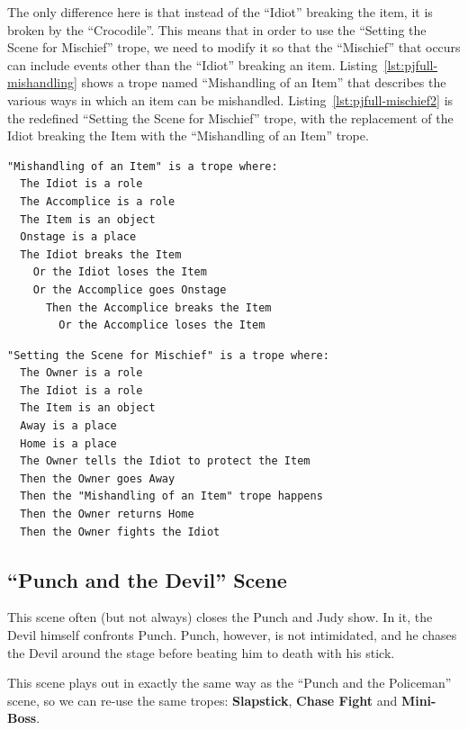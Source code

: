 \documentclass[11pt]{report}
\begin{document}
The only difference here is that instead of the ``Idiot'' breaking the item, it
is broken by the ``Crocodile''. This means that in order to use the ``Setting
the Scene for Mischief'' trope, we need to modify it so that the ``Mischief''
that occurs can include events other than the ``Idiot'' breaking an item.
Listing~\ref{lst:pjfull-mishandling} shows a trope named ``Mishandling of an Item'' that describes the various
ways in which an item can be mishandled. Listing~\ref{lst:pjfull-mischief2} is
the redefined ``Setting the Scene for Mischief'' trope, with the replacement of
the Idiot breaking the Item with the ``Mishandling of an Item'' trope.

\begin{lstlisting}[showstringspaces=false,
label=lst:pjfull-mishandling,caption={The ``Mishandling of an Item'' trope in TropICAL}]
"Mishandling of an Item" is a trope where:
  The Idiot is a role
  The Accomplice is a role
  The Item is an object
  Onstage is a place
  The Idiot breaks the Item
    Or the Idiot loses the Item
    Or the Accomplice goes Onstage
      Then the Accomplice breaks the Item
        Or the Accomplice loses the Item
\end{lstlisting}

\begin{lstlisting}[showstringspaces=false,
label=lst:pjfull-mischief2,caption={The ``Setting the Scene for Mischief''
trope with ``Mishandling of an Item'' embedded}]
"Setting the Scene for Mischief" is a trope where:
  The Owner is a role
  The Idiot is a role
  The Item is an object
  Away is a place
  Home is a place
  The Owner tells the Idiot to protect the Item
  Then the Owner goes Away
  Then the "Mishandling of an Item" trope happens
  Then the Owner returns Home
  Then the Owner fights the Idiot
\end{lstlisting}


\subsection{``Punch and the Devil'' Scene}
This scene often (but not always) closes the Punch and Judy show. In it, the
Devil himself confronts Punch. Punch, however, is not intimidated, and he chases
the Devil around the stage before beating him to death with his stick.

This scene plays out in exactly the same way as the ``Punch and the Policeman''
scene, so we can re-use the same tropes: \textbf{Slapstick}, \textbf{Chase
  Fight} and \textbf{Mini-Boss}.
\end{document}
